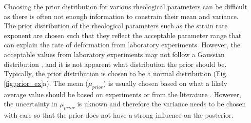 \documentclass[12pt]{article}
\begin{document}
{Choosing the prior distribution for various rheological parameters can be difficult as there is often not enough information to constrain their mean and variance. The prior distribution of the rheological parameters such as the strain rate exponent are chosen such that they reflect the acceptable parameter range that can explain the rate of deformation from laboratory experiments. However, the acceptable values from laboratory experiments may not follow a Gaussian distribution \citep{korenaga2008new}, 
and it is not apparent what distribution the prior should be.  Typically, the prior distribution is chosen to be a normal distribution (Fig.\ref{fig:prior_ex}a).
The mean ($\mu_{prior}$) is usually chosen based on what a likely average value should be based on experiments or from  the literature \citep{korenaga2008new}. However, the uncertainty in $\mu_{prior}$ is uknown and therefore the variance needs to be chosen with care so that the prior does not have a strong influence on the posterior.    %
\begin{figure}[H]
\centering
\hspace{-1.2cm}
\hspace{-0.2cm}
\end{figure}}
\end{document}
